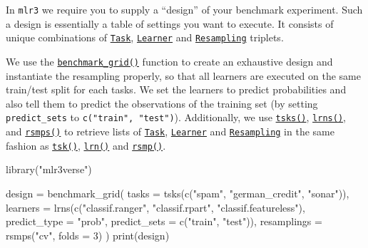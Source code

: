 \documentclass[
]{scrbook}
\newenvironment{Shaded}{\begin{snugshade}}{\end{snugshade}}
\newcommand{\AttributeTok}[1]{\textcolor[rgb]{0.77,0.63,0.00}{#1}}
\newcommand{\DecValTok}[1]{\textcolor[rgb]{0.00,0.00,0.81}{#1}}
\newcommand{\FunctionTok}[1]{\textcolor[rgb]{0.00,0.00,0.00}{#1}}
\newcommand{\NormalTok}[1]{#1}
\newcommand{\OtherTok}[1]{\textcolor[rgb]{0.56,0.35,0.01}{#1}}
\newcommand{\StringTok}[1]{\textcolor[rgb]{0.31,0.60,0.02}{#1}}
\renewenvironment{Shaded} {\begin{snugshade}\small} {\end{snugshade}}
\begin{document}
In \texttt{mlr3} we require you to supply a ``design'' of your benchmark experiment.
Such a design is essentially a table of settings you want to execute.
It consists of unique combinations of \href{https://mlr3.mlr-org.com/reference/Task.html}{\texttt{Task}}, \href{https://mlr3.mlr-org.com/reference/Learner.html}{\texttt{Learner}} and \href{https://mlr3.mlr-org.com/reference/Resampling.html}{\texttt{Resampling}} triplets.

We use the \href{https://mlr3.mlr-org.com/reference/benchmark_grid.html}{\texttt{benchmark\_grid()}} function to create an exhaustive design and instantiate the resampling properly, so that all learners are executed on the same train/test split for each tasks.
We set the learners to predict probabilities and also tell them to predict the observations of the training set (by setting \texttt{predict\_sets} to \texttt{c("train",\ "test")}).
Additionally, we use \href{https://mlr3.mlr-org.com/reference/mlr_sugar.html}{\texttt{tsks()}}, \href{https://mlr3.mlr-org.com/reference/mlr_sugar.html}{\texttt{lrns()}}, and \href{https://mlr3.mlr-org.com/reference/mlr_sugar.html}{\texttt{rsmps()}} to retrieve lists of \href{https://mlr3.mlr-org.com/reference/Task.html}{\texttt{Task}}, \href{https://mlr3.mlr-org.com/reference/Learner.html}{\texttt{Learner}} and \href{https://mlr3.mlr-org.com/reference/Resampling.html}{\texttt{Resampling}} in the same fashion as \href{https://mlr3.mlr-org.com/reference/mlr_sugar.html}{\texttt{tsk()}}, \href{https://mlr3.mlr-org.com/reference/mlr_sugar.html}{\texttt{lrn()}} and \href{https://mlr3.mlr-org.com/reference/mlr_sugar.html}{\texttt{rsmp()}}.

\begin{Shaded}
\begin{Highlighting}[]
\FunctionTok{library}\NormalTok{(}\StringTok{"mlr3verse"}\NormalTok{)}

\NormalTok{design }\OtherTok{=} \FunctionTok{benchmark\_grid}\NormalTok{(}
  \AttributeTok{tasks =} \FunctionTok{tsks}\NormalTok{(}\FunctionTok{c}\NormalTok{(}\StringTok{"spam"}\NormalTok{, }\StringTok{"german\_credit"}\NormalTok{, }\StringTok{"sonar"}\NormalTok{)),}
  \AttributeTok{learners =} \FunctionTok{lrns}\NormalTok{(}\FunctionTok{c}\NormalTok{(}\StringTok{"classif.ranger"}\NormalTok{, }\StringTok{"classif.rpart"}\NormalTok{, }\StringTok{"classif.featureless"}\NormalTok{),}
    \AttributeTok{predict\_type =} \StringTok{"prob"}\NormalTok{, }\AttributeTok{predict\_sets =} \FunctionTok{c}\NormalTok{(}\StringTok{"train"}\NormalTok{, }\StringTok{"test"}\NormalTok{)),}
  \AttributeTok{resamplings =} \FunctionTok{rsmps}\NormalTok{(}\StringTok{"cv"}\NormalTok{, }\AttributeTok{folds =} \DecValTok{3}\NormalTok{)}
\NormalTok{)}
\FunctionTok{print}\NormalTok{(design)}
\end{Highlighting}
\end{Shaded}
\end{document}
